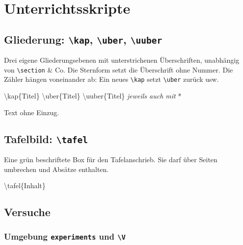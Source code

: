 \documentclass[a4paper,11pt,parskip=half]{scrartcl}
\newcommand{\cs}[1]{\texttt{\textbackslash #1}}
\newcommand{\env}[1]{\texttt{#1}}
\begin{document}
\section{Unterrichtsskripte}

\subsection{Gliederung: \cs{kap}, \cs{uber}, \cs{uuber}}

Drei eigene Gliederungsebenen mit unterstrichenen Überschriften, unabhängig von
\cs{section} \& Co. Die Sternform setzt die Überschrift ohne Nummer. Die Zähler hängen
voneinander ab: Ein neues \cs{kap} setzt \cs{uber} zurück usw.

\begin{befehl}{\textbackslash kap\{Titel\} \quad \textbackslash uber\{Titel\} \quad \textbackslash uuber\{Titel\} \quad \textit{jeweils auch mit} *}\end{befehl}

\begin{beispielseite}
Text ohne Einzug.

\end{beispielseite}

\subsection{Tafelbild: \cs{tafel}}

Eine grün beschriftete Box für den Tafelanschrieb. Sie darf über Seiten umbrechen
und Absätze enthalten.

\begin{befehl}{\textbackslash tafel\{Inhalt\}}\end{befehl}

\begin{beispiel}
\end{beispiel}

\subsection{Versuche}

\subsubsection*{Umgebung \env{experiments} und \cs{V}}
\end{document}
